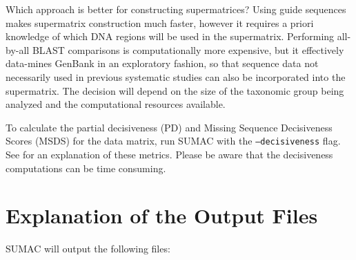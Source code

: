 \documentclass[10pt]{report}
\begin{document}
Which approach is better for constructing supermatrices?
Using guide sequences makes supermatrix construction much faster, however
it requires a priori knowledge of which DNA regions will be used
in the supermatrix.
Performing all-by-all BLAST comparisons is computationally
more expensive, but it effectively data-mines GenBank in an exploratory
fashion, so that sequence data not necessarily used in previous systematic
studies can also be incorporated into the supermatrix.
The decision will depend on the size of the taxonomic group being
analyzed and the computational resources available.

To calculate the partial decisiveness (PD) and Missing Sequence Decisiveness Scores (MSDS)
for the data matrix, run SUMAC with the \texttt{--decisiveness} flag.
See \citet{sumac} for an explanation of these metrics.
Please be aware that the decisiveness computations can be time consuming.

\section{Explanation of the Output Files}

SUMAC will output the following files:
\end{document}
